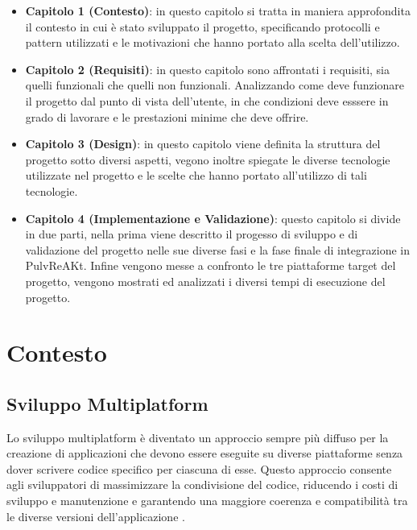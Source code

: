 \documentclass[12pt,a4paper,openright,twoside]{book}
\begin{document}
\begin{itemize}
    \item \textbf{Capitolo 1 (Contesto)}: in questo capitolo si tratta in maniera approfondita il contesto in cui è stato sviluppato il progetto, 
    specificando protocolli e pattern utilizzati e le motivazioni che hanno portato alla scelta dell'utilizzo.
    
    \item \textbf{Capitolo 2 (Requisiti)}: in questo capitolo sono affrontati i requisiti, sia quelli funzionali che quelli non funzionali. 
    Analizzando come deve funzionare il progetto dal punto di vista dell'utente, in che condizioni deve esssere in grado di lavorare 
    e le prestazioni minime che deve offrire. 
    
    \item \textbf{Capitolo 3 (Design)}: in questo capitolo viene definita la struttura del progetto sotto diversi aspetti, 
    vegono inoltre spiegate le diverse tecnologie utilizzate nel progetto e le scelte che hanno portato all'utilizzo di tali tecnologie.
    
    \item \textbf{Capitolo 4 (Implementazione e Validazione)}: questo capitolo si divide in due parti, nella prima viene descritto il progesso di sviluppo e di validazione
    del progetto nelle sue diverse fasi e la fase finale di integrazione in PulvReAKt. Infine vengono messe a confronto le tre piattaforme target del progetto, 
    vengono mostrati ed analizzati i diversi tempi di esecuzione del progetto. 
    
\end{itemize}

\chapter{Contesto}\label{chap:Contesto}

\section{Sviluppo Multiplatform}

Lo sviluppo multiplatform è diventato un approccio sempre più diffuso per la creazione di applicazioni che devono essere eseguite
su diverse piattaforme senza dover scrivere codice specifico per ciascuna di esse. Questo approccio consente agli sviluppatori di massimizzare
la condivisione del codice, riducendo i costi di sviluppo e manutenzione e garantendo una maggiore coerenza e compatibilità tra 
le diverse versioni dell'applicazione \cite{7128878}.
\end{document}
